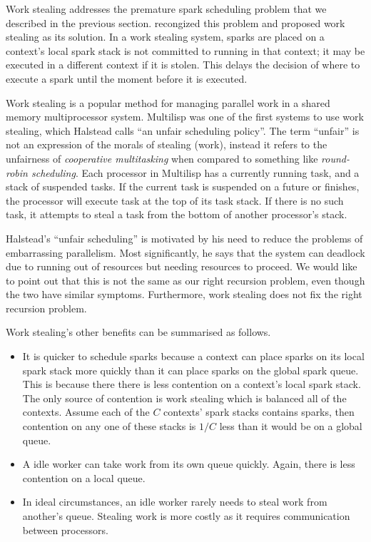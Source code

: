 
Work stealing addresses the premature spark scheduling problem that we
described in the previous section.
\citet{wang:2006:hons} recongized this problem and proposed work stealing as
its solution.
In a work stealing system,
sparks are placed on a context's local spark stack
is not committed to running in that context;
it may be executed in a different context if it is stolen.
This delays the decision of where to execute a spark until the moment
before it is executed.

Work stealing is a popular method for managing parallel work in a shared
memory multiprocessor system.
Multilisp \citep{halstead:1985:multilisp} was one of the first systems to
use work stealing,
which Halstead calls ``an unfair scheduling policy''.
The term ``unfair'' is not an expression of the morals of stealing (work),
instead it refers to the unfairness of \emph{cooperative multitasking} when
compared to something like \emph{round-robin scheduling}.
Each processor in Multilisp has a currently running task,
and a stack of suspended tasks.
If the current task is suspended on a future or finishes,
the processor will execute task at the top of its task stack.
If there is no such task,
it attempts to steal a task from the bottom of another processor's stack.

Halstead's ``unfair scheduling'' is motivated by his need to reduce the
problems of embarrassing parallelism.
Most significantly,
he says that the system can deadlock due to running out of resources but
needing resources to proceed.
We would like to point out that 
this is not the same as our right recursion problem,
even though the two have similar symptoms.
Furthermore,
work stealing does not fix the right recursion problem.

Work stealing's other benefits can be summarised as follows.

\begin{itemize}

    \item
    It is quicker to schedule sparks because
    a context can place sparks on its local spark stack more quickly
    than it can place sparks on the global spark queue.
    This is because there there is less contention on a context's
    local spark stack.
    The only source of contention is work stealing which is balanced all of
    the contexts.
    Assume each of the $C$ contexts' spark stacks contains sparks, then
    contention on any one of these stacks is $1/C$ less than it would be on
    a global queue.

    \item
    A idle worker can take work from its own queue quickly.
    Again, there is less contention on a local queue.

    \item
    In ideal circumstances,
    an idle worker rarely needs to steal work from another's queue.
    Stealing work is more costly as it requires communication between
    processors.

\end{itemize}

